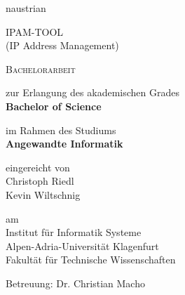 
\begin{otherlanguage*}{naustrian}

\begin{titlepage}


\begin{center}


	
	{ \Huge IPAM-TOOL\\ 
		\vspace{5mm}
	\LARGE(IP Address Management)}\\
	\vspace{15mm}
	
	{\LARGE \textsc{Bachelorarbeit}} \\

	
	\vspace{10mm}
	
	\Large{zur Erlangung des akademischen Grades}\\
	
	\vspace{7mm}
	\LARGE{\textbf{Bachelor of Science}}\\
	\vspace{7mm}

	\Large{im Rahmen des Studiums}\\
	
	\vspace{7mm}
	\Large{\textbf{Angewandte Informatik}}\\
	\vspace{7mm}
	
	\Large{eingereicht von}\\

	\vspace{7mm}
	{\Large Christoph Riedl}\\
	{\Large Kevin Wiltschnig}\\
	\vspace{7mm}


	\Large{am}\\
\Large{Institut f{\"u}r Informatik Systeme}\\
\Large{Alpen-Adria-Universit{\"a}t Klagenfurt}\\
\Large{Fakult{\"a}t f{\"u}r Technische Wissenschaften}\\

\end{center}

\begin{center}
	\Large{Betreuung: Dr. Christian Macho} \\
\end{center}





\end{titlepage}
\end{otherlanguage*}
